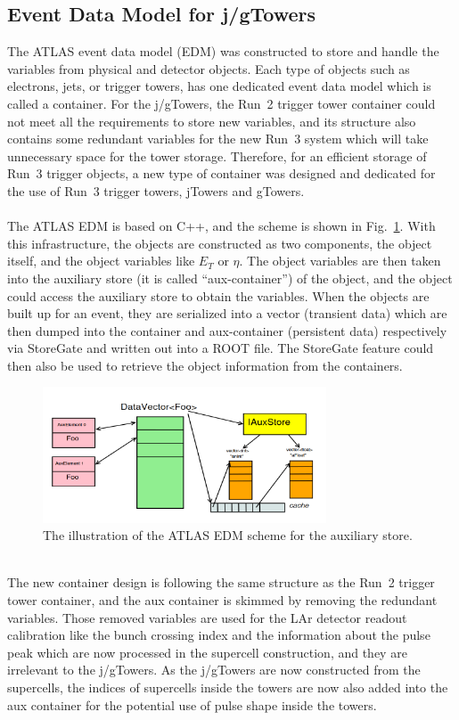 \subsection{Event Data Model for j/gTowers}
The ATLAS event data model\cite{Buckley:2015tjh} (EDM) was constructed to store and handle the variables from physical and detector objects. Each type of objects such as electrons, jets, or trigger towers, has one dedicated event data model which is called a container. For the j/gTowers, the Run~2 trigger tower container could not meet all the requirements to store new variables, and its structure also contains some redundant variables for the new Run~3 system which will take unnecessary space for the tower storage. Therefore, for an efficient storage of Run~3 trigger objects, a new type of container was designed and dedicated for the use of Run~3 trigger towers, jTowers and gTowers. 
\\
\\The ATLAS EDM is based on C++, and the scheme is shown in Fig.~\ref{Fig:edm}. With this infrastructure, the objects are constructed as two components, the object itself, and the object variables like $E_{T}$ or $\eta$. The object variables are then taken into the auxiliary store (it is called ``aux-container'') of the object, and the object could access the auxiliary store to obtain the variables. When the objects are built up for an event, they are serialized into a vector (transient data) which are then dumped into the container and aux-container (persistent data) respectively via StoreGate\cite{Calafiura:2003gf} and written out into a ROOT file. The StoreGate feature could then also be used to retrieve the object information from the containers.
\begin{figure}[!h]                
	\includegraphics[width=0.75\textwidth]{Chapter6/EDM.png}
	\begin{center}
		\caption{The illustration of the ATLAS EDM scheme for the auxiliary store\cite{Buckley:2015tjh}.}
		\label{Fig:edm}            
	\end{center}
\end{figure}
\noindent
\\The new container design is following the same structure as the Run~2 trigger tower container, and the aux container is skimmed by removing the redundant variables. Those removed variables are used for the LAr detector readout calibration like the bunch crossing index and the information about the pulse peak which are now processed in the supercell construction, and they are irrelevant to the j/gTowers. As the j/gTowers are now constructed from the supercells, the indices of supercells inside the towers are now also added into the aux container for the potential use of pulse shape inside the towers. 
